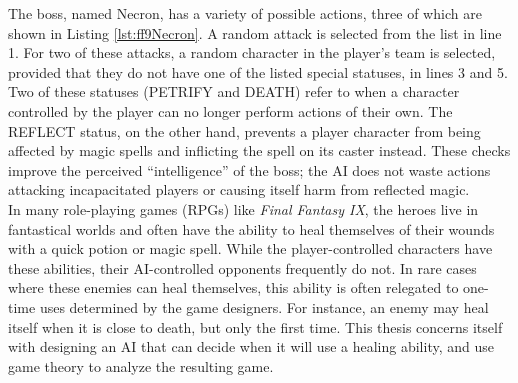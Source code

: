 The boss, named Necron, has a variety of possible actions, three of which are shown in Listing \ref{lst:ff9Necron}. A random attack is selected from the list in line 1. For two of these attacks, a random character in the player's team is selected, provided that they do not have one of the listed special statuses, in lines 3 and 5. Two of these statuses (PETRIFY and DEATH) refer to when a character controlled by the player can no longer perform actions of their own. The REFLECT status, on the other hand, prevents a player character from being affected by magic spells and inflicting the spell on its caster instead. These checks improve the perceived ``intelligence'' of the boss; the AI does not waste actions attacking incapacitated players or causing itself harm from reflected magic.\\

In many role-playing games (RPGs) like \textit{Final Fantasy IX}, the heroes live in fantastical worlds and often have the ability to heal themselves of their wounds with a quick potion or magic spell. While the player-controlled characters have these abilities, their AI-controlled opponents frequently do not. In rare cases where these enemies can heal themselves, this ability is often relegated to one-time uses determined by the game designers. For instance, an enemy may heal itself when it is close to death, but only the first time. This thesis concerns itself with designing an AI that can decide when it will use a healing ability, and use game theory to analyze the resulting game.